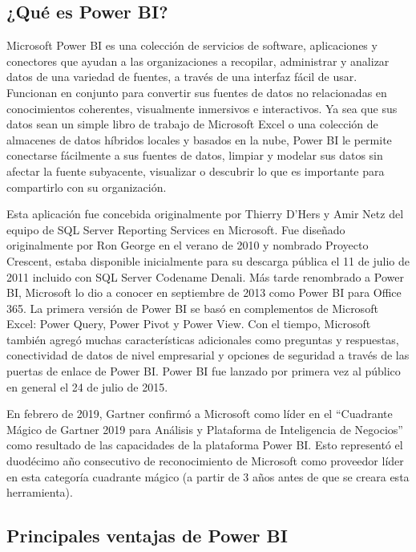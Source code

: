 \documentclass[
]{book}
\begin{document}
\hypertarget{quuxe9-es-power-bi}{%
\subsection{¿Qué es Power BI?}\label{quuxe9-es-power-bi}}

Microsoft Power BI es una colección de servicios de software, aplicaciones y conectores que ayudan a las organizaciones a recopilar, administrar y analizar datos de una variedad de fuentes, a través de una interfaz fácil de usar. Funcionan en conjunto para convertir sus fuentes de datos no relacionadas en conocimientos coherentes, visualmente inmersivos e interactivos. Ya sea que sus datos sean un simple libro de trabajo de Microsoft Excel o una colección de almacenes de datos híbridos locales y basados en la nube, Power BI le permite conectarse fácilmente a sus fuentes de datos, limpiar y modelar sus datos sin afectar la fuente subyacente, visualizar o descubrir lo que es importante para compartirlo con su organización.

Esta aplicación fue concebida originalmente por Thierry D'Hers y Amir Netz del equipo de SQL Server Reporting Services en Microsoft. Fue diseñado originalmente por Ron George en el verano de 2010 y nombrado Proyecto Crescent, estaba disponible inicialmente para su descarga pública el 11 de julio de 2011 incluido con SQL Server Codename Denali. Más tarde renombrado a Power BI, Microsoft lo dio a conocer en septiembre de 2013 como Power BI para Office 365. La primera versión de Power BI se basó en complementos de Microsoft Excel: Power Query, Power Pivot y Power View. Con el tiempo, Microsoft también agregó muchas características adicionales como preguntas y respuestas, conectividad de datos de nivel empresarial y opciones de seguridad a través de las puertas de enlace de Power BI. Power BI fue lanzado por primera vez al público en general el 24 de julio de 2015.

En febrero de 2019, Gartner confirmó a Microsoft como líder en el ``Cuadrante Mágico de Gartner 2019 para Análisis y Plataforma de Inteligencia de Negocios'' como resultado de las capacidades de la plataforma Power BI. Esto representó el duodécimo año consecutivo de reconocimiento de Microsoft como proveedor líder en esta categoría cuadrante mágico (a partir de 3 años antes de que se creara esta herramienta).

\hypertarget{principales-ventajas-de-power-bi}{%
\subsection{Principales ventajas de Power BI}\label{principales-ventajas-de-power-bi}}
\end{document}
